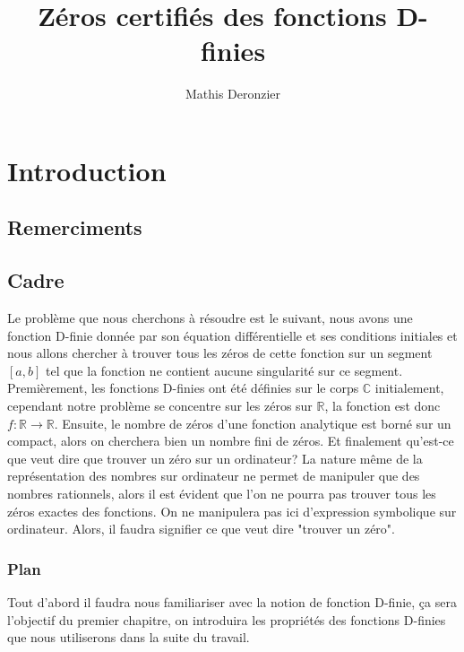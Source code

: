 \documentclass[a4paper,10.5pt]{article}
\title{Zéros certifiés des fonctions D-finies}
\author{Mathis Deronzier}
\date{}
\begin{document}
	
	\maketitle
	\renewcommand{\contentsname}{Sommaire}
	\newpage
	\tableofcontents
	\newpage
	
	
	\section{Introduction}
	\newtheorem{theorem}{Théorème}[section] 
	\newtheorem{proposition}{Proposition}
	\newtheorem{corollaire}{Corollaire}
	\newtheorem{definition}{Définition}
	\newtheorem{demonstration}{Démonstration}
	\subsection{Remerciments}
	\subsection{Cadre}
	
	Le problème que nous cherchons à résoudre est le suivant, nous avons une fonction D-finie donnée par son équation différentielle et ses conditions initiales et nous allons chercher à trouver tous les zéros de cette fonction sur un segment $[a,b]$ tel que la fonction ne contient aucune singularité sur ce segment. \\
	Premièrement, les fonctions D-finies ont été définies sur le corps $\mathbb{C}$ initialement, cependant notre problème se concentre sur les zéros sur $\mathbb{R}$, la fonction est donc $f: \mathbb{R} \rightarrow \mathbb{R}$.
	Ensuite, le nombre de zéros d'une fonction analytique est borné sur un compact, alors on cherchera bien un nombre fini de zéros.
	Et finalement qu'est-ce que veut dire que trouver un zéro sur un ordinateur? La nature même de la représentation des nombres sur ordinateur ne permet de manipuler que des nombres rationnels, alors il est évident que l'on ne pourra pas trouver tous les zéros exactes des fonctions. On ne manipulera pas ici d'expression symbolique sur ordinateur. Alors, il faudra signifier ce que veut dire "trouver un zéro".
	
	\subsubsection{Plan}
	
	Tout d'abord il faudra nous familiariser avec la notion de fonction D-finie, ça sera l'objectif du premier chapitre, on introduira les propriétés des fonctions D-finies que nous utiliserons dans la suite du travail.
	
\end{document}
